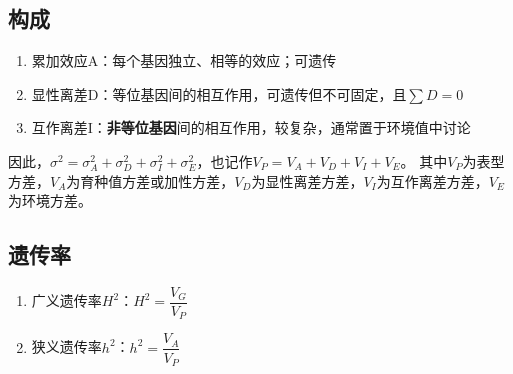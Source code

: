 \documentclass[a4paper, 12pt]{report}
\begin{document}
\subsection{构成}
\begin{enumerate}
    \item 累加效应A：每个基因独立、相等的效应；可遗传
    \item 显性离差D：等位基因间的相互作用，可遗传但不可固定，且\(\sum D=0\)
    \item 互作离差I：\textbf{非等位基因}间的相互作用，较复杂，通常置于环境值中讨论
\end{enumerate}
因此，\(\sigma^2 = \sigma^2_A + \sigma^2_D + \sigma^2_I + \sigma^2_E\)，也记作\(V_P = V_A + V_D + V_I + V_E\)。
其中\(V_P\)为表型方差，\(V_A\)为育种值方差或加性方差，\(V_D\)为显性离差方差，\(V_I\)为互作离差方差，\(V_E\)为环境方差。
\subsection{遗传率}
\begin{enumerate}
    \item 广义遗传率\(H^2\)：\(H^2 = \dfrac{V_G}{V_P}\)
    \item 狭义遗传率\(h^2\)：\(h^2 = \dfrac{V_A}{V_P}\)
\end{enumerate}
\end{document}
